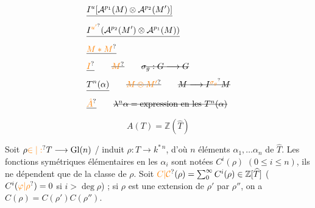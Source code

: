 \[
\begin{aligned}
&\deleted{I^u[\mathcal A^{p_1}(M)\otimes\mathcal A^{p_2}(M')]}\\
&\deleted{I^{\unsure{u'}}(\mathcal A^{p_2}(M')\otimes\mathcal A^{p_1}(M))}\\
&\deleted{\unsure{M*M}}\\
&\deleted{\unsure{I}}\qquad\deleted{\unsure{M}}\qquad\deleted{\sigma_g:G\longrightarrow G}\\
&\deleted{T^n(\alpha)}\qquad\deleted{\unsure{M\otimes M'}}\qquad\deleted{M\longrightarrow I^{\unsure{\sigma_g}}M}\\
&\deleted{\unsure{\hat A}}\qquad\deleted{\lambda^n\alpha=\text{expression en les }T^n(\alpha)}
\end{aligned}
\]
\[
A(T)=\mathbb Z(\widehat T)
\]

Soit $\rho\unsure{\in|:}T\longrightarrow\operatorname{Gl}(n)$ / induit $\rho:T\longrightarrow k^{*\,n}$, d'où $n$ éléments
$\alpha_1,\ldots\alpha_n$ de $\widehat T$. Les fonctions symétriques élémentaires en
les $\alpha_i$ sont notées $C^i(\rho)$ $(0\leq i\leq n)$, ils ne dépendent
que de la classe de $\rho$. Soit $\unsure{C|\mathcal C}(\rho)=\sum_0^\infty C^i(\rho)\in\mathbb Z[\widehat T]$
($C^i(\unsure{\varphi|\rho})=0$ si $i>\deg\rho$) ; si $\rho$ est une extension de $\rho'$ par
$\rho''$, on a $C(\rho)=C(\rho')C(\rho'')$.

